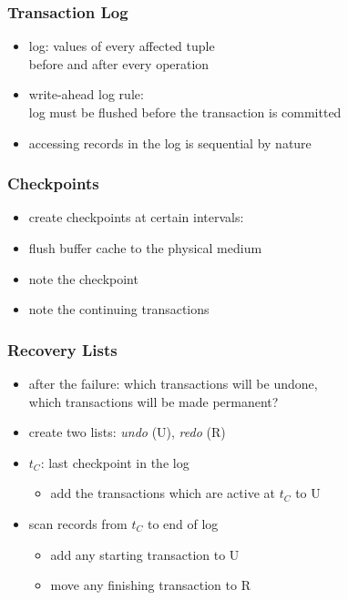 \documentclass[dvipsnames]{beamer}
\theoremstyle{plain}
\begin{document}
\begin{frame}
  \frametitle{Transaction Log}

  \begin{itemize}
    \item \alert{log}: values of every affected tuple\\
      before and after every operation

    \medskip
    \item \alert{write-ahead log rule}:\\
      log must be flushed before the transaction is committed

    \pause
    \medskip
    \item accessing records in the log is sequential by nature
  \end{itemize}
\end{frame}

\begin{frame}
  \frametitle{Checkpoints}

  \begin{itemize}
    \item create \alert{checkpoints} at certain intervals:

    \medskip
    \item flush buffer cache to the physical medium
    \item note the checkpoint
    \item note the continuing transactions
  \end{itemize}
\end{frame}

\begin{frame}
  \frametitle{Recovery Lists}

  \begin{itemize}
    \item after the failure: which transactions will be undone,\\
      which transactions will be made permanent?
    \item create two lists: \emph{undo} (U), \emph{redo} (R)

    \pause
    \medskip
    \item $t_C$: last checkpoint in the log
    \begin{itemize}
      \item add the transactions which are active at $t_C$ to U
    \end{itemize}

    \item scan records from $t_C$ to end of log
    \begin{itemize}
      \item add any starting transaction to U
      \item move any finishing transaction to R
    \end{itemize}
  \end{itemize}
\end{frame}
\end{document}

